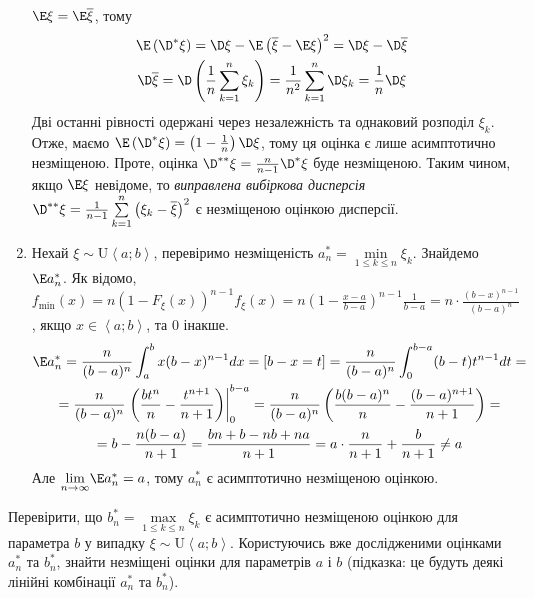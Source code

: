 \begin{example}
\begin{enumerate}
        $\E\xi = \E\overline{\xi}$, тому
        \begin{gather*}
            \E\left( \D^* \xi\right) = \D\xi - \E\left(\overline{\xi} - \E\xi\right)^2= \D\xi - \D\overline{\xi} \\
            \D\overline{\xi} = \D\left(\frac{1}{n}\sum\limits_{k=1}^n \xi_k \right) = \frac{1}{n^2} \sum\limits_{k=1}^n \D\xi_k = \frac{1}{n} \D\xi
        \end{gather*}
        Дві останні рівності одержані через незалежність та однаковий розподіл $\xi_k$. Отже, маємо $\E\left( \D^* \xi\right) = \left( 1- \frac{1}{n}\right) \D\xi$,
        тому ця оцінка є лише асимптотично незміщеною. Проте, оцінка $\D^{**}\xi = \frac{n}{n-1} \D^*\xi$ буде незміщеною.
        Таким чином, якщо $\E\xi$ невідоме, то \emph{виправлена вибіркова дисперсія} 
        $\D^{**}\xi = \frac{1}{n-1} \sum\limits_{k=1}^n \left(\xi_k - \overline{\xi} \right)^2$ є незміщеною оцінкою дисперсії.
        \item Нехай $\xi \sim \mathrm{U}\left< a; b\right>$, перевіримо незміщеність $a^*_n = \underset{1\leq k \leq n}{\min}\xi_k$.
        Знайдемо $\E a^*_n$. Як відомо, 
        $f_{\min}(x) = n \left(1-F_{\xi}(x)\right)^{n-1} f_{\xi}(x) = n\left( 1- \frac{x-a}{b-a}\right)^{n-1}\frac{1}{b-a} = n\cdot\frac{(b-x)^{n-1}}{(b-a)^n}$, якщо
        $x \in \left< a; b\right>$, та $0$ інакше.
        \begin{gather*}
            \E a^*_n = \frac{n}{(b-a)^n} \int_a^b x(b-x)^{n-1} dx = \left[ b-x = t \right] = 
            \frac{n}{(b-a)^n} \int_0^{b-a} (b-t)t^{n-1} dt = \\
            = \frac{n}{(b-a)^n} \left.\left( \frac{bt^n}{n} - \frac{t^{n+1}}{n+1}\right)\right|_0^{b-a} = 
            \frac{n}{(b-a)^n} \left(\frac{b(b-a)^n}{n} - \frac{(b-a)^{n+1}}{n+1}\right) = \\
            = b - \frac{n(b-a)}{n+1} = \frac{bn + b - nb + na}{n+1} = a \cdot \frac{n}{n+1} + \frac{b}{n+1} \neq a
         \end{gather*}
         Але $\underset{n\to\infty}{\lim} \E a^*_n = a$, тому $a^*_n$ є асимптотично незміщеною оцінкою.
    \end{enumerate}
 \end{example}
 \begin{exercise}
     Перевірити, що $b^*_n = \underset{1\leq k \leq n}{\max}\xi_k$ є асимптотично незміщеною оцінкою для параметра $b$ у випадку $\xi \sim \mathrm{U}\left< a; b\right>$.
     Користуючись вже дослідженими оцінками $a^*_n$ та $b^*_n$, знайти незміщені оцінки для параметрів $a$ і $b$ (підказка: це будуть деякі лінійні комбінації $a^*_n$ та $b^*_n$).
 \end{exercise}

